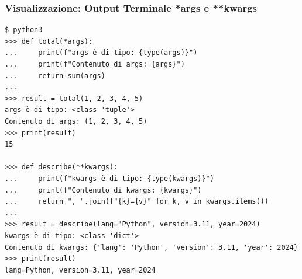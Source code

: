 \subsubsection{Visualizzazione: Output Terminale *args e **kwargs}
\label{subsubsec:fun-args-kwargs-terminal}
\begin{tcolorbox}[title=Dimostrazione *args e **kwargs nel Terminale, colback=black!5, colframe=blue!50!black]
\begin{lstlisting}[style=python]
$ python3
>>> def total(*args):
...     print(f"args è di tipo: {type(args)}")
...     print(f"Contenuto di args: {args}")
...     return sum(args)
...
>>> result = total(1, 2, 3, 4, 5)
args è di tipo: <class 'tuple'>
Contenuto di args: (1, 2, 3, 4, 5)
>>> print(result)
15

>>> def describe(**kwargs):
...     print(f"kwargs è di tipo: {type(kwargs)}")
...     print(f"Contenuto di kwargs: {kwargs}")
...     return ", ".join(f"{k}={v}" for k, v in kwargs.items())
...
>>> result = describe(lang="Python", version=3.11, year=2024)
kwargs è di tipo: <class 'dict'>
Contenuto di kwargs: {'lang': 'Python', 'version': 3.11, 'year': 2024}
>>> print(result)
lang=Python, version=3.11, year=2024
\end{lstlisting}
\end{tcolorbox}

